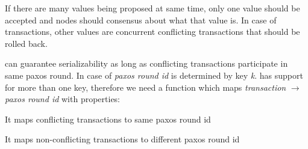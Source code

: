 
If there are many values being proposed at same time, only one value should be accepted and nodes should consensus about what that value is. In case of transactions, other values are concurrent conflicting transactions that should be rolled back.

\paxos can guarantee serializability as long as conflicting transactions participate in same paxos round. In case of \lwt \emph{paxos round id} is determined by key \emph{k}. \mpp has support for more than one key, therefore we need a function which maps \emph{transaction} $\rightarrow $ \emph{paxos round id} with properties: 
\begin{enumerate*}
\item It maps conflicting transactions to same paxos round id 
\item It maps non-conflicting transactions to different paxos round id
\end{enumerate*}